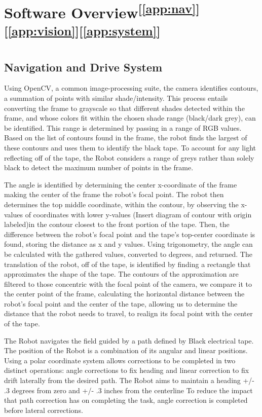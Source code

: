 \documentclass[11pt, twoside]{report}
\newcommand{\refapp}[1]{\textsuperscript{[\ref{#1}]}}
\begin{document}
\section{Software Overview\refapp{app:nav}\refapp{app:vision}\refapp{app:system}}
\subsection{Navigation and Drive System}
Using OpenCV, a common image-processing suite, the camera identifies contours, a summation of points with similar shade/intensity. This process entails converting the frame to grayscale so that different shades detected within the frame, and whose colors fit within the chosen shade range (black/dark grey), can be identified. This range is determined by passing in a range of RGB values. Based on the list of contours found in the frame, the robot finds the largest of these contours and uses them to identify the black tape. To account for any light reflecting off of the tape, the Robot considers a range of greys rather than solely black to detect the maximum number of points in the frame.

The angle is identified by determining the center x-coordinate of the frame making the center of the frame the robot’s focal point. The robot then determines the top middle coordinate, within the contour, by observing the x-values of coordinates with  lower y-values (Insert diagram of contour with origin labeled)in the contour closest to the front portion of the tape. Then, the difference between the robot’s focal point and the tape’s top-center coordinate is found, storing the distance as x and y values. Using trigonometry, the angle can be calculated with the gathered values, converted to degrees, and returned. 
The translation of the robot, off of the tape, is identified by finding a rectangle that approximates the shape of the tape. The contours of  the approximation are filtered to those concentric with the focal point of the camera, we compare it to the center point of the frame, calculating the horizontal distance between the robot’s focal point and the center of the tape, allowing us to determine the distance that the robot needs to travel, to realign its focal point with the center of the tape.

The Robot navigates the field guided by a path defined by Black electrical tape. The position of the Robot is a combination of its angular and linear positions. Using a polar coordinate system allows corrections to be completed in two distinct operations: angle corrections to fix heading and linear correction to fix drift laterally from the desired path. The Robot aims to maintain a heading +/- .3 degrees from zero and +/- .3 inches from the centerline To reduce the impact that path correction has on completing the task, angle correction is completed before lateral corrections.
\end{document}
